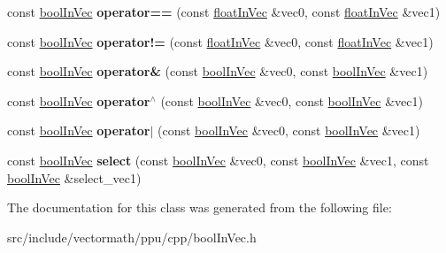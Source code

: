 \begin{DoxyCompactItemize}
\item 
\hypertarget{classVectormath_1_1boolInVec_a0c3d1d83ce1a894626a8d4265a5f2ed9}{const \hyperlink{classVectormath_1_1boolInVec}{bool\-In\-Vec} {\bfseries operator==} (const \hyperlink{classVectormath_1_1floatInVec}{float\-In\-Vec} \&vec0, const \hyperlink{classVectormath_1_1floatInVec}{float\-In\-Vec} \&vec1)}\label{classVectormath_1_1boolInVec_a0c3d1d83ce1a894626a8d4265a5f2ed9}

\item 
\hypertarget{classVectormath_1_1boolInVec_a4d52df8e4badb8a75fc9bc565a86ad94}{const \hyperlink{classVectormath_1_1boolInVec}{bool\-In\-Vec} {\bfseries operator!=} (const \hyperlink{classVectormath_1_1floatInVec}{float\-In\-Vec} \&vec0, const \hyperlink{classVectormath_1_1floatInVec}{float\-In\-Vec} \&vec1)}\label{classVectormath_1_1boolInVec_a4d52df8e4badb8a75fc9bc565a86ad94}

\item 
\hypertarget{classVectormath_1_1boolInVec_a74ccbd8738ab84dc5be0ed51cc6377f3}{const \hyperlink{classVectormath_1_1boolInVec}{bool\-In\-Vec} {\bfseries operator\&} (const \hyperlink{classVectormath_1_1boolInVec}{bool\-In\-Vec} \&vec0, const \hyperlink{classVectormath_1_1boolInVec}{bool\-In\-Vec} \&vec1)}\label{classVectormath_1_1boolInVec_a74ccbd8738ab84dc5be0ed51cc6377f3}

\item 
\hypertarget{classVectormath_1_1boolInVec_a5c92593983de1257dafe7301c6665108}{const \hyperlink{classVectormath_1_1boolInVec}{bool\-In\-Vec} {\bfseries operator$^\wedge$} (const \hyperlink{classVectormath_1_1boolInVec}{bool\-In\-Vec} \&vec0, const \hyperlink{classVectormath_1_1boolInVec}{bool\-In\-Vec} \&vec1)}\label{classVectormath_1_1boolInVec_a5c92593983de1257dafe7301c6665108}

\item 
\hypertarget{classVectormath_1_1boolInVec_a33e35c11ed0093bc8949a434da600031}{const \hyperlink{classVectormath_1_1boolInVec}{bool\-In\-Vec} {\bfseries operator$\vert$} (const \hyperlink{classVectormath_1_1boolInVec}{bool\-In\-Vec} \&vec0, const \hyperlink{classVectormath_1_1boolInVec}{bool\-In\-Vec} \&vec1)}\label{classVectormath_1_1boolInVec_a33e35c11ed0093bc8949a434da600031}

\item 
\hypertarget{classVectormath_1_1boolInVec_ac6cfb2aee5afd68adfddecc9f41d915b}{const \hyperlink{classVectormath_1_1boolInVec}{bool\-In\-Vec} {\bfseries select} (const \hyperlink{classVectormath_1_1boolInVec}{bool\-In\-Vec} \&vec0, const \hyperlink{classVectormath_1_1boolInVec}{bool\-In\-Vec} \&vec1, const \hyperlink{classVectormath_1_1boolInVec}{bool\-In\-Vec} \&select\-\_\-vec1)}\label{classVectormath_1_1boolInVec_ac6cfb2aee5afd68adfddecc9f41d915b}

\end{DoxyCompactItemize}


The documentation for this class was generated from the following file\-:\begin{DoxyCompactItemize}
\item 
src/include/vectormath/ppu/cpp/bool\-In\-Vec.\-h\end{DoxyCompactItemize}

